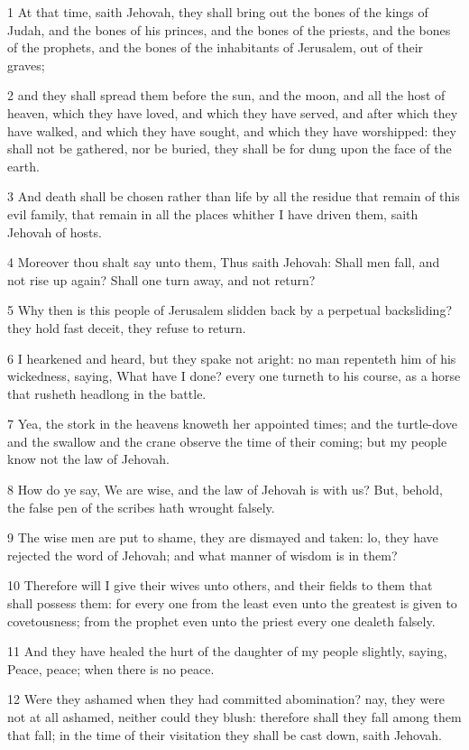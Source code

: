\par 1 At that time, saith Jehovah, they shall bring out the bones of the kings of Judah, and the bones of his princes, and the bones of the priests, and the bones of the prophets, and the bones of the inhabitants of Jerusalem, out of their graves;
\par 2 and they shall spread them before the sun, and the moon, and all the host of heaven, which they have loved, and which they have served, and after which they have walked, and which they have sought, and which they have worshipped: they shall not be gathered, nor be buried, they shall be for dung upon the face of the earth.
\par 3 And death shall be chosen rather than life by all the residue that remain of this evil family, that remain in all the places whither I have driven them, saith Jehovah of hosts.
\par 4 Moreover thou shalt say unto them, Thus saith Jehovah: Shall men fall, and not rise up again? Shall one turn away, and not return?
\par 5 Why then is this people of Jerusalem slidden back by a perpetual backsliding? they hold fast deceit, they refuse to return.
\par 6 I hearkened and heard, but they spake not aright: no man repenteth him of his wickedness, saying, What have I done? every one turneth to his course, as a horse that rusheth headlong in the battle.
\par 7 Yea, the stork in the heavens knoweth her appointed times; and the turtle-dove and the swallow and the crane observe the time of their coming; but my people know not the law of Jehovah.
\par 8 How do ye say, We are wise, and the law of Jehovah is with us? But, behold, the false pen of the scribes hath wrought falsely.
\par 9 The wise men are put to shame, they are dismayed and taken: lo, they have rejected the word of Jehovah; and what manner of wisdom is in them?
\par 10 Therefore will I give their wives unto others, and their fields to them that shall possess them: for every one from the least even unto the greatest is given to covetousness; from the prophet even unto the priest every one dealeth falsely.
\par 11 And they have healed the hurt of the daughter of my people slightly, saying, Peace, peace; when there is no peace.
\par 12 Were they ashamed when they had committed abomination? nay, they were not at all ashamed, neither could they blush: therefore shall they fall among them that fall; in the time of their visitation they shall be cast down, saith Jehovah.

